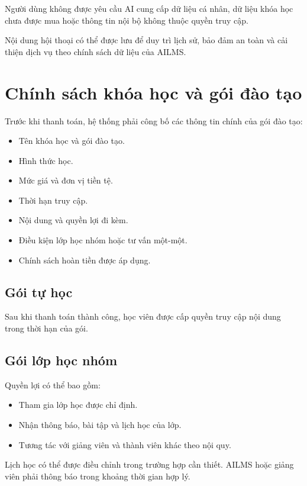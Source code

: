 \documentclass[12pt,a4paper]{article}
\begin{document}
Người dùng không được yêu cầu AI cung cấp dữ liệu cá nhân, dữ liệu khóa học
chưa được mua hoặc thông tin nội bộ không thuộc quyền truy cập.

Nội dung hội thoại có thể được lưu để duy trì lịch sử, bảo đảm an toàn
và cải thiện dịch vụ theo chính sách dữ liệu của AILMS.

\section{Chính sách khóa học và gói đào tạo}

Trước khi thanh toán, hệ thống phải công bố các thông tin chính của gói đào tạo:

\begin{itemize}
    \item Tên khóa học và gói đào tạo.
    \item Hình thức học.
    \item Mức giá và đơn vị tiền tệ.
    \item Thời hạn truy cập.
    \item Nội dung và quyền lợi đi kèm.
    \item Điều kiện lớp học nhóm hoặc tư vấn một-một.
    \item Chính sách hoàn tiền được áp dụng.
\end{itemize}

\subsection{Gói tự học}

Sau khi thanh toán thành công, học viên được cấp quyền truy cập nội dung
trong thời hạn của gói.

\subsection{Gói lớp học nhóm}

Quyền lợi có thể bao gồm:

\begin{itemize}
    \item Tham gia lớp học được chỉ định.
    \item Nhận thông báo, bài tập và lịch học của lớp.
    \item Tương tác với giảng viên và thành viên khác theo nội quy.
\end{itemize}

Lịch học có thể được điều chỉnh trong trường hợp cần thiết.
AILMS hoặc giảng viên phải thông báo trong khoảng thời gian hợp lý.
\end{document}
